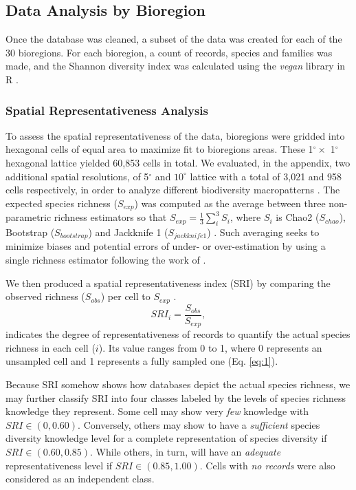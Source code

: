 \documentclass[12pt,authoryear]{elsarticle}
\begin{document}
\subsection{Data Analysis by Bioregion}
\label{sec:data-analysis}
Once the database was cleaned, a subset of the data was created for each of the 30 bioregions. For each bioregion, a count of records, species and families was made, and the Shannon diversity index was calculated using the \textit{vegan} library in R \citep{vegan}.

\subsubsection{Spatial Representativeness Analysis}
\label{sec:spat-repr-analys}
To assess the spatial representativeness of the data, bioregions were gridded into hexagonal cells of equal area to maximize fit to bioregions areas. These 1$^{\circ} \times$ 1$^{\circ}$ hexagonal lattice yielded 60,853 cells in total. We evaluated, in the appendix, two additional spatial resolutions, of 5$^\circ$ and $10^\circ$ lattice with a total of 3,021 and 958 cells respectively, in order to analyze different biodiversity macropatterns \citep{tittensor2010global}. The expected species richness ($S_{exp}$) was computed as the average between three non-parametric richness estimators so that $S_{exp} = \frac{1}{3}\sum_i^3S_i $, where $S_i$ is Chao2 ($S_{chao}$), Bootstrap ($S_{bootstrap}$) and Jackknife 1 ($S_{jackknife1}$) \citep[see][for individual definition of indices]{magurran2011}. Such averaging seeks to minimize biases and potential errors of under- or over-estimation by using a single richness estimator following the work of \citep{mora2008completeness, troia2017}.

We then produced a spatial representativeness index (SRI) by comparing the observed richness ($S_{obs}$) per cell to $S_{exp}$ \citep{troia2017}.
\begin{equation}
  \label{eq:1}
  SRI_i = \frac{S_{obs}}{S_{exp}},
\end{equation}
indicates the degree of representativeness of records to quantify the actual species richness in each cell ($i$). Its value ranges from 0 to 1, where 0 represents an unsampled cell and 1 represents a fully sampled one (Eq. \ref{eq:1}).

Because SRI somehow shows how databases depict the actual species richness, we may further classify SRI into four classes labeled by the levels of species richness knowledge they represent. Some cell may show very \textit{few} knowledge with $SRI \in (0,0.60)$. Conversely, others may show to have a \textit{sufficient} species diversity knowledge level for a complete representation of species diversity if $SRI \in (0.60,0.85)$. While others, in turn,  will have an \textit{adequate} representativeness level if $SRI \in (0.85,1.00)$. Cells with \textit{no records} were also considered as an independent class.
\end{document}

